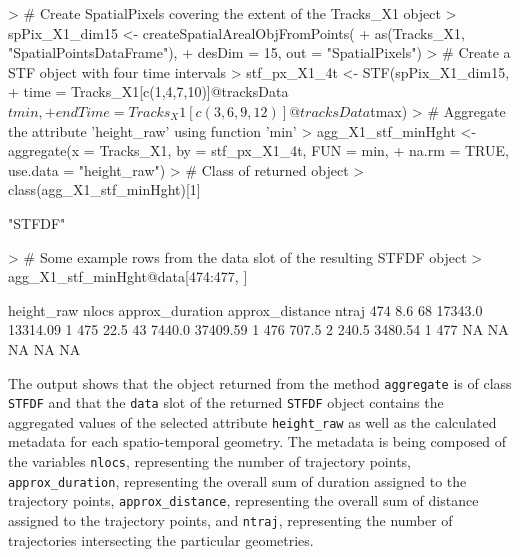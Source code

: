 \documentclass[12pt, oneside, a4paper]{scrbook}
\let\code=\texttt
\begin{document}
\begin{small}
\begin{Schunk}
\begin{Sinput}
> # Create SpatialPixels covering the extent of the Tracks_X1 object
> spPix_X1_dim15 <- createSpatialArealObjFromPoints(
+   as(Tracks_X1, "SpatialPointsDataFrame"), 
+   desDim = 15, out = "SpatialPixels")
> # Create a STF object with four time intervals
> stf_px_X1_4t <- STF(spPix_X1_dim15,
+                     time = Tracks_X1[c(1,4,7,10)]@tracksData$tmin,
+                     endTime = Tracks_X1[c(3,6,9,12)]@tracksData$tmax)
> # Aggregate the attribute 'height_raw' using function 'min'
> agg_X1_stf_minHght <- aggregate(x = Tracks_X1, by = stf_px_X1_4t, FUN = min,
+                                 na.rm = TRUE, use.data = "height_raw")
> # Class of returned object
> class(agg_X1_stf_minHght)[1]
\end{Sinput}
\begin{Soutput}
[1] "STFDF"
\end{Soutput}
\begin{Sinput}
> # Some example rows from the data slot of the resulting STFDF object
> agg_X1_stf_minHght@data[474:477, ]
\end{Sinput}
\begin{Soutput}
    height_raw nlocs approx_duration approx_distance ntraj
474        8.6    68         17343.0        13314.09     1
475       22.5    43          7440.0        37409.59     1
476      707.5     2           240.5         3480.54     1
477         NA    NA              NA              NA    NA
\end{Soutput}
\end{Schunk}
\end{small}


\par\medskip

The output shows that the object returned from the method \code{aggregate} is of class \code{STFDF} and that the \code{data} slot of the returned \code{STFDF} object contains the aggregated values of the selected attribute \code{height\_raw} as well as the calculated metadata for each spatio-temporal geometry. 
The metadata is being composed of the variables \code{nlocs}, representing the number of trajectory points, \code{approx\_duration}, representing the overall sum of duration assigned to the trajectory points, \code{approx\_distance}, representing the overall sum of distance assigned to the trajectory points, and \code{ntraj}, representing the number of trajectories intersecting the particular geometries. 
\par\medskip
\end{document}
